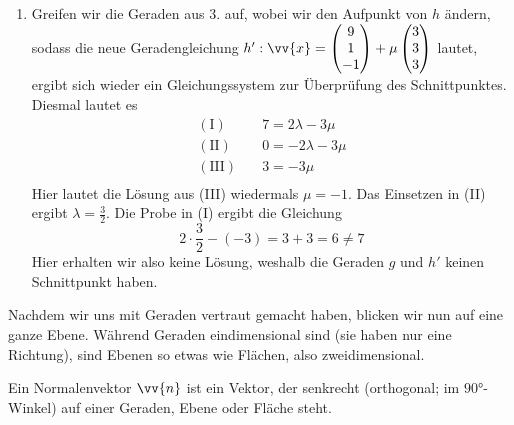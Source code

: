 \documentclass[ngerman, 12pt]{nssheetxea}
\begin{document}
\begin{example}
\begin{enumerate}
Daraus erhalten wir drei Gleichungssysteme mit zwei Unbekannten. Wir lösen das Gleichungssystem beispielsweise wiefolgt:
\begin{align*}
\mathrm{(I)} \quad & 7 = 2 \lambda - 3 \mu \\
\mathrm{(II)} \quad & -1 = -2 \lambda - 3 \mu \\
\mathrm{(III)} \quad & 3 = -3 \mu \\
\end{align*}
(III) liefert uns direkt $\mu = -1$. (III) in (II) ergibt $-1 = -2\lambda - (-3) \Rightarrow \lambda = 2$. Nun machen wir die Probe, indem wir beide Werte in (I) einsetzen: $7 = 2 \cdot 2 - (-3)$. Die Rechnung geht auf, wir haben einen Schnittpunkt! Um den Schnittpunkt $S$ zu bestimmen, setzen wir den ermittelten Wert von $\lambda$ oder von $\mu$ in die jeweilige Gerade ein. Zur Veranschaulichung, dass beide Male der gleiche Punkt herauskommt, prüfen wir exemplarisch beide Punkte:
\[ g: \vv{OS} = \colvec[2]{1}{-4} + 2 \cdot \colvec[2]{-2}{0} = \colvec[6]{-3}{-4} \]
\[ h: \vv{OS} = \colvec[9]{0}{-1} - 1 \cdot \colvec[3]{3}{3} = \colvec[6]{-3}{-4} \]
Wir sehen: Der Schnittpunkt hat die Koordinaten $S(6|-3|-4)$.
\item Greifen wir die Geraden aus 3. auf, wobei wir den Aufpunkt von $h$ ändern, sodass die neue Geradengleichung $h':\vv{x}=\colvec[9]{1}{-1} + \mu \colvec[3]{3}{3}$ lautet, ergibt sich wieder ein Gleichungssystem zur Überprüfung des Schnittpunktes. Diesmal lautet es
\begin{align*}
\mathrm{(I)} \quad & 7 = 2 \lambda - 3 \mu \\
\mathrm{(II)} \quad & 0 = -2 \lambda - 3 \mu \\
\mathrm{(III)} \quad & 3 = -3 \mu \\
\end{align*}
Hier lautet die Lösung aus (III) wiedermals $\mu = -1$. Das Einsetzen in (II) ergibt $\lambda=\frac{3}{2}$. Die Probe in (I) ergibt die Gleichung
\[ 2 \cdot \frac{3}{2} - (-3) = 3 + 3 = 6 \neq 7\]
Hier erhalten wir also keine Lösung, weshalb die Geraden $g$ und $h'$ keinen Schnittpunkt haben.
\end{enumerate}
\end{example}
Nachdem wir uns mit Geraden vertraut gemacht haben, blicken wir nun auf eine ganze Ebene. Während Geraden eindimensional sind (sie haben nur eine Richtung), sind Ebenen so etwas wie Flächen, also zweidimensional.

\begin{definition}
Ein Normalenvektor $\vv{n}$  ist ein Vektor, der senkrecht (orthogonal; im $\ang{90}$-Winkel) auf einer Geraden, Ebene oder Fläche steht.
\end{definition}
\end{document}
